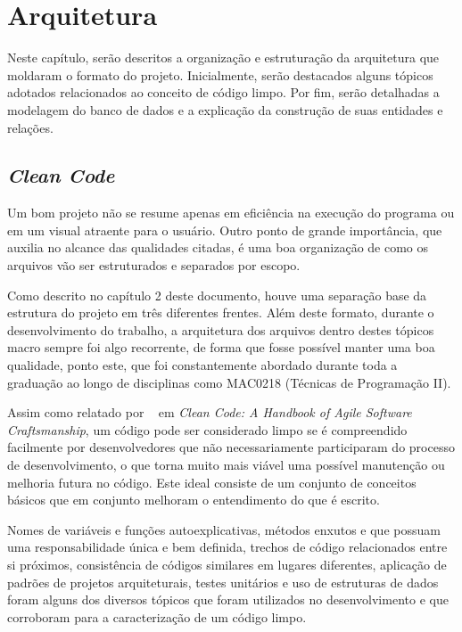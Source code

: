 
\chapter{Arquitetura}

Neste capítulo, serão descritos a organização e estruturação da arquitetura que
moldaram o formato do projeto. Inicialmente, serão destacados alguns tópicos
adotados relacionados ao conceito de código limpo. Por fim, serão detalhadas a
modelagem do banco de dados e a explicação da construção de suas entidades e
relações.

\section{\textit{Clean Code}}

Um bom projeto não se resume apenas em eficiência na execução do programa ou em
um visual atraente para o usuário. Outro ponto de grande importância, que
auxilia no alcance das qualidades citadas, é uma boa organização de como os
arquivos vão ser estruturados e separados por escopo.

Como descrito no capítulo 2 deste documento, houve uma separação base da
estrutura do projeto em três diferentes frentes. Além deste formato, durante o
desenvolvimento do trabalho, a arquitetura dos arquivos dentro destes tópicos
macro sempre foi algo recorrente, de forma que fosse possível manter uma boa
qualidade, ponto este, que foi constantemente abordado durante toda a graduação
ao longo de disciplinas como MAC0218 (Técnicas de Programação II).

Assim como relatado por ~\citet{cleanCode} em \textit{Clean Code: A Handbook of
    Agile Software Craftsmanship}, um código pode ser considerado limpo se é
compreendido facilmente por desenvolvedores que não necessariamente
participaram do processo de desenvolvimento, o que torna muito mais viável uma
possível manutenção ou melhoria futura no código. Este ideal consiste de um
conjunto de conceitos básicos que em conjunto melhoram o entendimento do que é
escrito.

Nomes de variáveis e funções autoexplicativas, métodos enxutos e que possuam
uma responsabilidade única e bem definida, trechos de código relacionados entre
si próximos, consistência de códigos similares em lugares diferentes, aplicação
de padrões de projetos arquiteturais, testes unitários e uso de estruturas de
dados foram alguns dos diversos tópicos que foram utilizados no desenvolvimento
e que corroboram para a caracterização de um código limpo.

